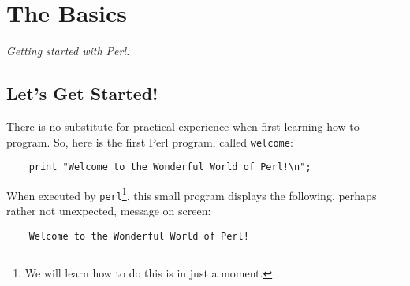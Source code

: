 \chapter{The Basics}

\textit{Getting started with Perl.}
\pjbskipstart

\section{Let's Get Started!}

There is no substitute for practical experience when first learning how to program.  So, here is the first Perl program, called \texttt{welcome}:

\pjbstartcode
\begin{verbatim}
    print "Welcome to the Wonderful World of Perl!\n";
\end{verbatim}
\pjbstopcode

\noindent When executed by \texttt{perl}\footnote{We will learn how to do this is in just a moment.}, this small program displays the following, perhaps rather not unexpected, message on screen:

\pjbstartcode
\begin{verbatim}
    Welcome to the Wonderful World of Perl!
\end{verbatim}
\pjbstopcode

